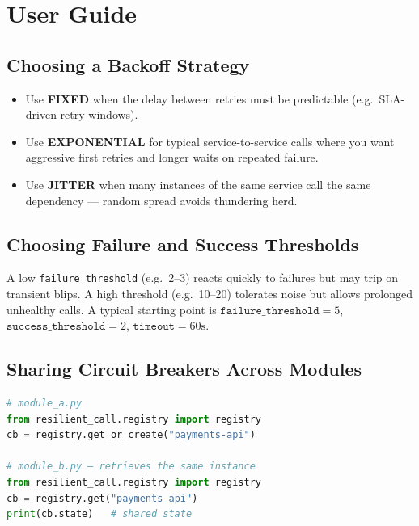 \section{User Guide}
\label{sec:user-guide}

\subsection{Choosing a Backoff Strategy}

\begin{itemize}[leftmargin=*, label=\textbullet]
    \item Use \textbf{FIXED} when the delay between retries must be
          predictable (e.g.\ SLA-driven retry windows).
    \item Use \textbf{EXPONENTIAL} for typical service-to-service calls
          where you want aggressive first retries and longer waits on
          repeated failure.
    \item Use \textbf{JITTER} when many instances of the same service
          call the same dependency — random spread avoids thundering herd.
\end{itemize}

\subsection{Choosing Failure and Success Thresholds}

A low \texttt{failure\_threshold} (e.g.\ 2--3) reacts quickly to failures but
may trip on transient blips.  A high threshold (e.g.\ 10--20) tolerates noise
but allows prolonged unhealthy calls.  A typical starting point is
$\texttt{failure\_threshold} = 5$, $\texttt{success\_threshold} = 2$,
$\texttt{timeout} = 60\text{s}$.

\subsection{Sharing Circuit Breakers Across Modules}

\begin{lstlisting}[language=Python, caption={Using the module-level registry}, label={lst:registry}]
# module_a.py
from resilient_call.registry import registry
cb = registry.get_or_create("payments-api")

# module_b.py — retrieves the same instance
from resilient_call.registry import registry
cb = registry.get("payments-api")
print(cb.state)   # shared state
\end{lstlisting}

